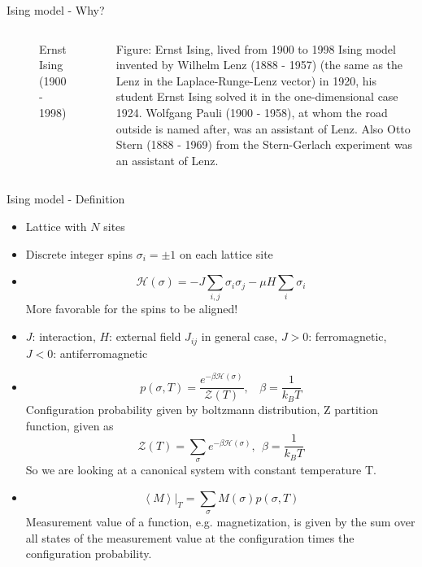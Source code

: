 \documentclass[handout]{beamer}
\begin{document}
\begin{frame}{Ising model - Why?}
\begin{columns}[c]
\begin{figure}[p]
		\caption{Ernst Ising (1900 - 1998)}
		\label{fig:awesome_image}
	\end{figure}
	 {Figure: Ernst Ising, lived from 1900 to 1998}
	 {Ising model invented by Wilhelm Lenz (1888 - 1957) (the same as the Lenz in the Laplace-Runge-Lenz vector) in 1920, his student Ernst Ising solved it in the one-dimensional case 1924.}
	 {Wolfgang Pauli (1900 - 1958), at whom the road outside is named after, was an assistant of Lenz.}
	 {Also Otto Stern (1888 - 1969) from the Stern-Gerlach experiment was an assistant of Lenz.}
\end{columns}
\end{frame}

\begin{frame}{Ising model - Definition}
\begin{itemize}
\item<2-> Lattice with \(N\) sites
\item<3-> Discrete integer spins \( \sigma_i = \pm 1 \) on each lattice site
\item<4-> \[ \mathscr{H}(\sigma) = -J \sum\limits_{i, j} \sigma_i \sigma_j - \mu H \sum\limits_i \sigma_i \]
	 {More favorable for the spins to be aligned!}
\item<5-> \( J \): interaction, \( H \): external field
	 {\( J_{ij} \) in general case, \( J>0 \): ferromagnetic, \( J<0 \): antiferromagnetic}
\item<6-> \[ p(\sigma, T) = \frac{e^{-\beta \mathscr{H}(\sigma)}}{\mathscr{Z}(T)}, \ \ \ \ \beta=\frac{1}{k_B T}\]
	 {Configuration probability given by boltzmann distribution, Z partition function, given as \[ \mathscr{Z}(T) = \sum_\sigma e^{-\beta \mathscr{H}(\sigma)},\ \ \beta = \frac{1}{k_B T} \]}
	 {So we are looking at a canonical system with constant temperature T.}
\item<7-> \[ \left< M \right>|_T = \sum_\sigma M(\sigma)p(\sigma,T) \]
	 {Measurement value of a function, e.g. magnetization, is given by the sum over all states of the measurement value at the configuration times the configuration probability.}
\end{itemize}
\end{frame}
\end{document}
